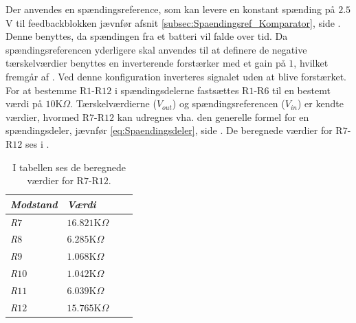 \noindent Der anvendes en spændingsreference, som kan levere en konstant spænding på $2.5$V til feedbackblokken jævnfør afsnit \ref{subsec:Spaendingsref_Komparator}, side \pageref{subsec:Spaendingsref_Komparator}. Denne benyttes, da spændingen fra et batteri vil falde over tid. 
Da spændingsreferencen yderligere skal anvendes til at definere de negative tærskelværdier benyttes en inverterende forstærker med et gain på $1$, hvilket fremgår af . Ved denne konfiguration inverteres signalet uden at blive forstærket. \\
For at bestemme R$1$-R$12$ i spændingsdelerne fastsættes R$1$-R$6$ til en bestemt værdi på $10$K$\Omega$. Tærskelværdierne ($V_{out}$) og spændingsreferencen ($V_{in}$) er kendte værdier, hvormed R$7$-R$12$ kan udregnes vha. den generelle formel for en spændingsdeler, jævnfør \eqref{eq:Spaendingsdeler}, side \pageref{subsec:Spaendingsref}. De beregnede værdier for R$7$-R$12$ ses i .
\begin{table}[H]
	\centering
	\begin{tabular}{|l|l|l|l|} \hline
		\textit{Modstand} & \textit{Værdi} \\ \hline
	\textit{R$7$} & $16.821$K$\Omega$ \\ \hline
	\textit{R$8$} & $6.285$K$\Omega$ \\ \hline
	\textit{R$9$} & $1.068$K$\Omega$ \\ \hline
	\textit{R$10$} & $1.042$K$\Omega$ \\ \hline
	\textit{R$11$} & $6.039$K$\Omega$ \\ \hline
	\textit{R$12$} & $15.765$K$\Omega$ \\ \hline    
	\end{tabular}
	\caption{I tabellen ses de beregnede værdier for R$7$-R$12$.}
	\label{tab:modtande_R7-R12}
\end{table}


